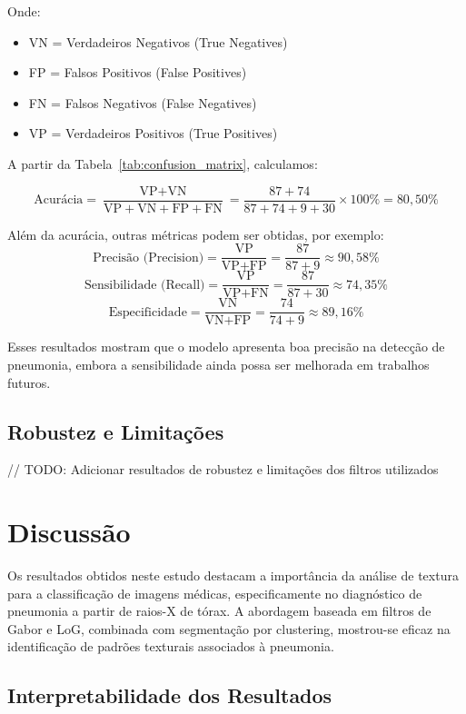 \documentclass[sigconf,nonacm]{acmart}
\begin{document}
Onde:
\begin{itemize}
  \item VN = Verdadeiros Negativos (True Negatives)
  \item FP = Falsos Positivos (False Positives)
  \item FN = Falsos Negativos (False Negatives)
  \item VP = Verdadeiros Positivos (True Positives)
\end{itemize}

A partir da Tabela~\ref{tab:confusion_matrix}, calculamos:

\[
\text{Acurácia} = \frac{\text{VP} + \text{VN}}{\text{VP} + \text{VN} + \text{FP} + \text{FN}}
= \frac{87 + 74}{87 + 74 + 9 + 30} \times 100\% = 80{,}50\%
\]

Além da acurácia, outras métricas podem ser obtidas, por exemplo:
\[
\text{Precisão (Precision)} = \frac{\text{VP}}{\text{VP} + \text{FP}}
= \frac{87}{87 + 9} \approx 90{,}58\%
\]
\[
\text{Sensibilidade (Recall)} = \frac{\text{VP}}{\text{VP} + \text{FN}}
= \frac{87}{87 + 30} \approx 74{,}35\%
\]
\[
\text{Especificidade} = \frac{\text{VN}}{\text{VN} + \text{FP}}
= \frac{74}{74 + 9} \approx 89{,}16\%
\]

Esses resultados mostram que o modelo apresenta boa precisão na detecção de pneumonia, embora a sensibilidade ainda possa ser melhorada em trabalhos futuros.

\subsection{Robustez e Limitações}

// TODO: Adicionar resultados de robustez e limitações dos filtros utilizados

\section{Discussão}

Os resultados obtidos neste estudo destacam a importância da análise de textura para a classificação de imagens médicas, especificamente no diagnóstico de pneumonia a partir de raios-X de tórax. A abordagem baseada em filtros de Gabor e LoG, combinada com segmentação por clustering, mostrou-se eficaz na identificação de padrões texturais associados à pneumonia.

\subsection{Interpretabilidade dos Resultados}
\end{document}
